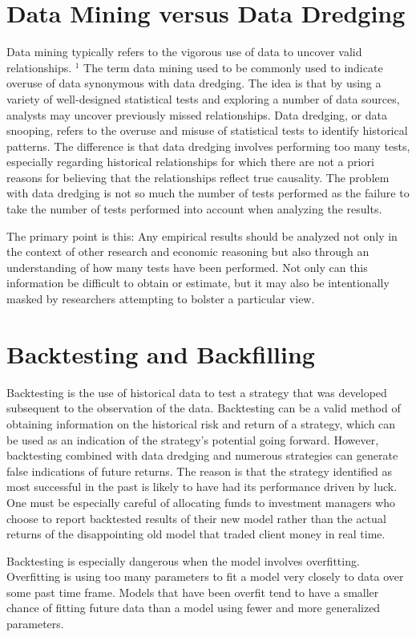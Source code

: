 \documentclass[11pt]{article}
\begin{document}
\section*{Data Mining versus Data Dredging}
Data mining typically refers to the vigorous use of data to uncover valid relationships. ${ }^{1}$ The term data mining used to be commonly used to indicate overuse of data synonymous with data dredging. The idea is that by using a variety of well-designed statistical tests and exploring a number of data sources, analysts may uncover previously missed relationships. Data dredging, or data snooping, refers to the overuse and misuse of statistical tests to identify historical patterns. The difference is that data dredging involves performing too many tests, especially regarding historical relationships for which there are not a priori reasons for believing that the relationships reflect true causality. The problem with data dredging is not so much the number of tests performed as the failure to take the number of tests performed into account when analyzing the results.

The primary point is this: Any empirical results should be analyzed not only in the context of other research and economic reasoning but also through an understanding of how many tests have been performed. Not only can this information be difficult to obtain or estimate, but it may also be intentionally masked by researchers attempting to bolster a particular view.

\section*{Backtesting and Backfilling}
Backtesting is the use of historical data to test a strategy that was developed subsequent to the observation of the data. Backtesting can be a valid method of obtaining information on the historical risk and return of a strategy, which can be used as an indication of the strategy's potential going forward. However, backtesting combined with data dredging and numerous strategies can generate false indications of future returns. The reason is that the strategy identified as most successful in the past is likely to have had its performance driven by luck. One must be especially careful of allocating funds to investment managers who choose to report backtested results of their new model rather than the actual returns of the disappointing old model that traded client money in real time.

Backtesting is especially dangerous when the model involves overfitting. Overfitting is using too many parameters to fit a model very closely to data over some past time frame. Models that have been overfit tend to have a smaller chance of fitting future data than a model using fewer and more generalized parameters.
\end{document}
